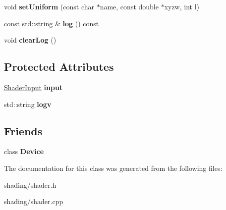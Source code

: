 \begin{DoxyCompactItemize}
\item 
\hypertarget{class_tempest_1_1_shader_a7011519f8be009a821b43e3f11e7571f}{void {\bfseries set\+Uniform} (const char $\ast$name, const double $\ast$xyzw, int l)}\label{class_tempest_1_1_shader_a7011519f8be009a821b43e3f11e7571f}

\item 
\hypertarget{class_tempest_1_1_shader_aef64d238ef354762aa3373a22cfd03c2}{const std\+::string \& {\bfseries log} () const }\label{class_tempest_1_1_shader_aef64d238ef354762aa3373a22cfd03c2}

\item 
\hypertarget{class_tempest_1_1_shader_ab0b2d0ac5b96f0c1477ebece6029e630}{void {\bfseries clear\+Log} ()}\label{class_tempest_1_1_shader_ab0b2d0ac5b96f0c1477ebece6029e630}

\end{DoxyCompactItemize}
\subsection*{Protected Attributes}
\begin{DoxyCompactItemize}
\item 
\hypertarget{class_tempest_1_1_shader_a7fbd56fc931b493a408e4e493b06b0a8}{\hyperlink{class_tempest_1_1_shader_input}{Shader\+Input} {\bfseries input}}\label{class_tempest_1_1_shader_a7fbd56fc931b493a408e4e493b06b0a8}

\item 
\hypertarget{class_tempest_1_1_shader_a9a6f4b97bc0767b785c6acc9c0819971}{std\+::string {\bfseries logv}}\label{class_tempest_1_1_shader_a9a6f4b97bc0767b785c6acc9c0819971}

\end{DoxyCompactItemize}
\subsection*{Friends}
\begin{DoxyCompactItemize}
\item 
\hypertarget{class_tempest_1_1_shader_a520fa05e0bf58785da428f7a0241eee2}{class {\bfseries Device}}\label{class_tempest_1_1_shader_a520fa05e0bf58785da428f7a0241eee2}

\end{DoxyCompactItemize}


The documentation for this class was generated from the following files\+:\begin{DoxyCompactItemize}
\item 
shading/shader.\+h\item 
shading/shader.\+cpp\end{DoxyCompactItemize}
